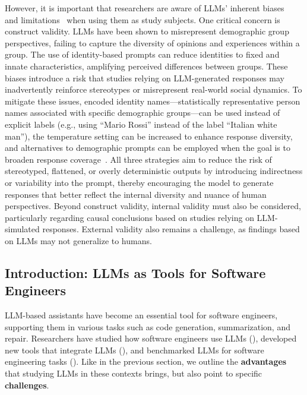 However, it is important that researchers are aware of LLMs' inherent biases~\cite{Crowell2023} and limitations~\cite{DBLP:journals/ais/HardingDLL24, DBLP:journals/corr/abs-2402-01908} when using them as study subjects. 
One critical concern is construct validity. LLMs have been shown to misrepresent demographic group perspectives, failing to capture the diversity of opinions and experiences within a group.
The use of identity-based prompts can reduce identities to fixed and innate characteristics, amplifying perceived differences between groups.
These biases introduce a risk that studies relying on LLM-generated responses may inadvertently reinforce stereotypes or misrepresent real-world social dynamics.
To mitigate these issues, encoded identity names---statistically representative person names associated with specific demographic groups---can be used instead of explicit labels (e.g., using ``Mario Rossi'' instead of the label ``Italian white man''), the temperature setting can be increased to enhance response diversity, and alternatives to demographic prompts can be employed when the goal is to broaden response coverage~\cite{DBLP:journals/corr/abs-2402-01908}.
All three strategies aim to reduce the risk of stereotyped, flattened, or overly deterministic outputs by introducing indirectness or variability into the prompt, thereby encouraging the model to generate responses that better reflect the internal diversity and nuance of human perspectives.
Beyond construct validity, internal validity must also be considered, particularly regarding causal conclusions based on studies relying on LLM-simulated responses.
External validity also remains a challenge, as findings based on LLMs may not generalize to humans.


\subsection{Introduction: LLMs as Tools for Software Engineers}

LLM-based assistants have become an essential tool for software engineers, supporting them in various tasks such as code generation, summarization, and repair.
Researchers have studied how software engineers use LLMs (\llmusage), developed new tools that integrate LLMs (\newtools), and benchmarked LLMs for software engineering tasks  (\benchmarkingtasks).
Like in the previous section, we outline the \textbf{advantages} that studying LLMs in these contexts brings, but also point to specific \textbf{challenges}.


